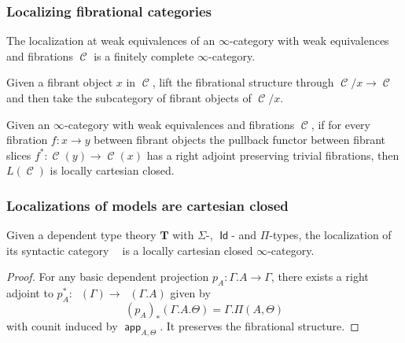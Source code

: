 \documentclass{beamer}
\DeclareMathOperator{\Id}{\mathsf{Id}}
\DeclareMathOperator{\cC}{\mathcal{C}}
\DeclareMathOperator{\app}{\mathsf{app}}
\DeclareMathOperator{\Syn}{\mathsf{Syn}(\mathbf{T})}
\begin{document}
\begin{frame}
  \frametitle{Localizing fibrational categories}

  \begin{prop}[Cisinski]
    The localization at weak equivalences of an $\infty$-category with weak
    equivalences and fibrations $\cC$ is a finitely complete $\infty$-category.
  \end{prop}
  \pause

  \begin{construction}[fibrant slice $\cC(x)$]
    Given a fibrant object $x$ in $\cC$, lift the fibrational structure through
    $\cC/x\rightarrow\cC$ and then take the subcategory of fibrant objects
    of $\cC/x$.
  \end{construction}
  \pause

  \begin{prop}[Cisinski]
    Given an $\infty$-category with weak equivalences and fibrations $\cC$, if
    for every fibration $f\colon x\rightarrow y$ between fibrant objects the
    pullback functor between fibrant slices $f^*\colon\cC(y)\rightarrow\cC(x)$
    has a right adjoint preserving trivial fibrations, then $L(\cC)$ is locally
    cartesian closed.
  \end{prop}

\end{frame}

\begin{frame}
  \frametitle{Localizations of models are cartesian closed}

  \begin{thm}[Kapulkin 2015]
    Given a dependent type theory $\mathbf{T}$ with $\Sigma$-, $\Id$- and
    $\Pi$-types, the localization of its syntactic category $\Syn$ is a
    locally cartesian closed $\infty$-category.
  \end{thm}
  \pause

  \begin{proof}
    For any basic dependent projection $p_A\colon\Gamma.A\rightarrow\Gamma$,
    there exists a right adjoint to
    $p_A^*\colon\Syn(\Gamma)\rightarrow\Syn(\Gamma.A)$ given by
    \[(p_A)_*(\Gamma.A.\Theta)=\Gamma.\Pi(A,\Theta)\]
    with counit induced by $\app_{A,\Theta}$. It preserves the fibrational
    structure.
  \end{proof}
\end{frame}

\begin{frame}
\end{frame}
\end{document}
